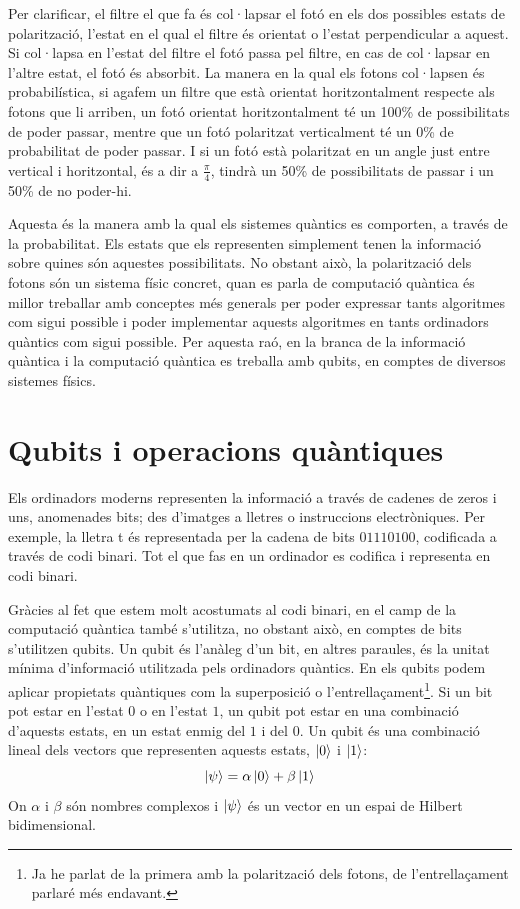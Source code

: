Per clarificar, el filtre el que fa és col·lapsar el fotó en els dos possibles estats de polarització, l'estat en el qual el filtre és orientat o l'estat perpendicular a aquest. Si col·lapsa en l'estat del filtre el fotó passa pel filtre, en cas de col·lapsar en l'altre estat, el fotó és absorbit. La manera en la qual els fotons col·lapsen és probabilística, si agafem un filtre que està orientat horitzontalment respecte als fotons que li arriben, un fotó orientat horitzontalment té un 100\% de possibilitats de poder passar, mentre que un fotó polaritzat verticalment té un 0\% de probabilitat de poder passar. I si un fotó està polaritzat en un angle just entre vertical i horitzontal, és a dir a $\frac{\pi}{4}$, tindrà un 50\% de possibilitats de passar i un 50\% de no poder-hi.

Aquesta és la manera amb la qual els sistemes quàntics es comporten, a través de la probabilitat. Els estats que els representen simplement tenen la informació sobre quines són aquestes possibilitats.
No obstant això, la polarització dels fotons són un sistema físic concret, quan es parla de computació quàntica és millor treballar amb conceptes més generals per poder expressar tants algoritmes com sigui possible i poder implementar aquests algoritmes en tants ordinadors quàntics com sigui possible. Per aquesta raó, en la branca de la informació quàntica i la computació quàntica es treballa amb qubits, en comptes de diversos sistemes físics.

\section{Qubits i operacions quàntiques}
Els ordinadors moderns representen la informació a través de cadenes de zeros i uns, anomenades bits; des d'imatges a lletres o instruccions electròniques. Per exemple, la lletra t és representada per la cadena de bits $01110100$, codificada a través de codi binari. Tot el que fas en un ordinador es codifica i representa en codi binari.

Gràcies al fet que estem molt acostumats al codi binari, en el camp de la computació quàntica també s'utilitza, no obstant això, en comptes de bits s'utilitzen qubits. Un qubit és l'anàleg d'un bit, en altres paraules, és la unitat mínima d'informació utilitzada pels ordinadors quàntics. En els qubits podem aplicar propietats quàntiques com la superposició o l'entrellaçament\footnote{Ja he parlat de la primera amb la polarització dels fotons, de l'entrellaçament parlaré més endavant.}. Si un bit pot estar en l'estat $0$ o en l'estat $1$, un qubit pot estar en una combinació d'aquests estats, en un estat enmig del $1$ i del $0$. Un qubit és una combinació lineal dels vectors que representen aquests estats, $\ket{0}$ i $\ket{1}$:
$$
\ket{\psi} = \alpha\ket{0} + \beta\ket{1}
$$
On $\alpha$ i $\beta$ són nombres complexos i $\ket{\psi}$ és un vector en un espai de Hilbert bidimensional.

